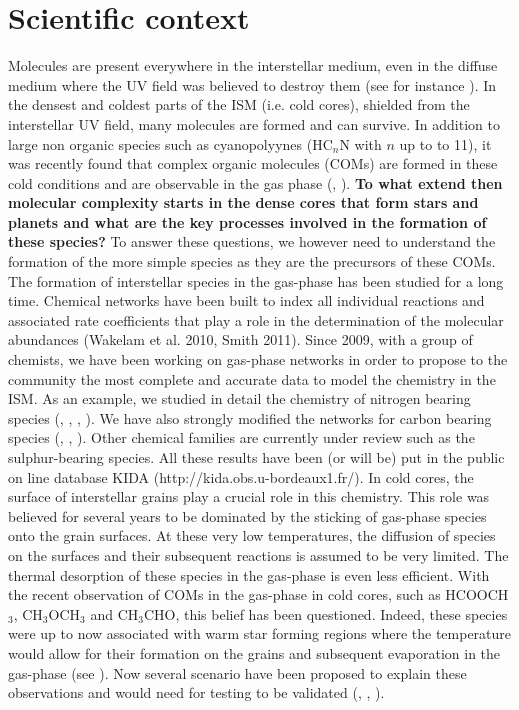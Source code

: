 \section{Scientific context} 


Molecules are present everywhere in the interstellar medium, even in the diffuse medium where the UV field was believed to destroy them (see for instance \cite{2012ApJ...753L..28L}). In the densest and coldest parts of the ISM (i.e. cold cores), shielded from the interstellar UV field, many molecules are formed and can survive. In addition to large non organic species such as cyanopolyynes (HC$_n$N with $n$ up to to 11), it was recently found that complex organic molecules (COMs) are formed in these cold conditions and are observable in the gas phase (\cite{Bacmann_2012}, \cite{2014ApJ...795L...2V}). \textbf{To what extend then molecular complexity starts in the dense cores that form stars and planets and what are the key processes involved in the formation of these species?} To answer these questions, we however need to understand the formation of the more simple species as they are the precursors of these COMs. \\
The formation of interstellar species in the gas-phase has been studied for a long time. Chemical networks have been built to index all individual reactions and associated rate coefficients that play a role in the determination of the molecular abundances (Wakelam et al. 2010, Smith 2011). Since 2009, with a group of chemists, we have been working on gas-phase networks in order to propose to the community the most complete and accurate data to model the chemistry in the ISM. As an example, we studied in detail the chemistry of nitrogen bearing species (\cite{2013PCCP...1513888D}, \cite{2012PNAS..10910233D}, \cite{2014MNRAS.443..398L}, \cite{2013arXiv1310.4350W}). We have also strongly modified the networks for carbon bearing species (\cite{Wakelam_2009}, \cite{2014MNRAS.437..930L}, \cite{2015MNRAS.453L..48W}). Other chemical families are currently under review such as the sulphur-bearing species. All these results have been (or will be) put in the public on line database KIDA (http://kida.obs.u-bordeaux1.fr/).
In cold cores, the surface of interstellar grains play a crucial role in this chemistry. This role was believed for several years to be dominated by the sticking of gas-phase species onto the grain surfaces. At these very low temperatures, the diffusion of species on the surfaces and their subsequent reactions is assumed to be very limited. The thermal desorption of these species in the gas-phase is even less efficient. With the recent observation of COMs in the gas-phase in cold cores, such as HCOOCH$_3$, CH$_3$OCH$_3$ and CH$_3$CHO, this belief has been questioned. Indeed, these species were up to now associated with warm star forming regions where the temperature would allow for their formation on the grains and subsequent evaporation in the gas-phase (see \cite{Herbst_2009}). Now several scenario have been proposed to explain these observations and would need for testing to be validated (\cite{2013ApJ...769...34V}, \cite{2015MNRAS.449L..16B}, \cite{2015MNRAS.447.4004R}).



